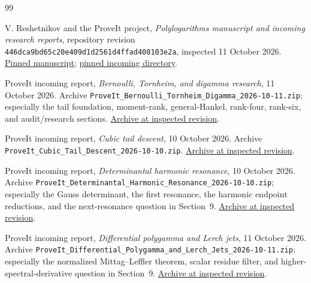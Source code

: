 \documentclass[11pt,letterpaper]{article}
\theoremstyle{definition}
\theoremstyle{remark}
\newcommand{\repoSHA}{\texttt{446dca9bd65c20e409d1d2561d4ffad408103e2a}}
\numberwithin{equation}{section}
\begin{document}


\begin{thebibliography}{99}
\raggedright
{}

V. Reshetnikov and the ProveIt project,
\emph{Polylogarithms manuscript and incoming research reports},
repository revision \repoSHA, inspected 11 October 2026.
\href{https://github.com/VladimirReshetnikov/ProveIt/tree/446dca9bd65c20e409d1d2561d4ffad408103e2a/Analysis/Polylogarithms/docs/manuscript}{Pinned manuscript};
\href{https://github.com/VladimirReshetnikov/ProveIt/tree/446dca9bd65c20e409d1d2561d4ffad408103e2a/docs/incoming}{pinned incoming directory}.

ProveIt incoming report,
\emph{Bernoulli, Tornheim, and digamma research}, 11 October 2026.
Archive \texttt{ProveIt\_Bernoulli\_Tornheim\_Digamma\_2026-10-11.zip};
especially the tail foundation, moment-rank, general-Hankel,
rank-four, rank-six, and audit/research sections.
\href{https://github.com/VladimirReshetnikov/ProveIt/blob/446dca9bd65c20e409d1d2561d4ffad408103e2a/docs/incoming/ProveIt_Bernoulli_Tornheim_Digamma_2026-10-11.zip}{Archive at inspected revision}.

ProveIt incoming report,
\emph{Cubic tail descent}, 10 October 2026.
Archive \texttt{ProveIt\_Cubic\_Tail\_Descent\_2026-10-10.zip}.
\href{https://github.com/VladimirReshetnikov/ProveIt/blob/446dca9bd65c20e409d1d2561d4ffad408103e2a/docs/incoming/ProveIt_Cubic_Tail_Descent_2026-10-10.zip}{Archive at inspected revision}.

ProveIt incoming report,
\emph{Determinantal harmonic resonance}, 10 October 2026.
Archive \texttt{ProveIt\_Determinantal\_Harmonic\_Resonance\_2026-10-10.zip};
especially the Gauss determinant, the first resonance, the harmonic
endpoint reductions, and the next-resonance question in Section~9.
\href{https://github.com/VladimirReshetnikov/ProveIt/blob/446dca9bd65c20e409d1d2561d4ffad408103e2a/docs/incoming/ProveIt_Determinantal_Harmonic_Resonance_2026-10-10.zip}{Archive at inspected revision}.

ProveIt incoming report,
\emph{Differential polygamma and Lerch jets}, 11 October 2026.
Archive \texttt{ProveIt\_Differential\_Polygamma\_and\_Lerch\_Jets\_2026-10-11.zip};
especially the normalized Mittag--Leffler theorem, scalar residue
filter, and higher-spectral-derivative question in Section~9.
\href{https://github.com/VladimirReshetnikov/ProveIt/blob/446dca9bd65c20e409d1d2561d4ffad408103e2a/docs/incoming/ProveIt_Differential_Polygamma_and_Lerch_Jets_2026-10-11.zip}{Archive at inspected revision}.


\end{thebibliography}
\end{document}
